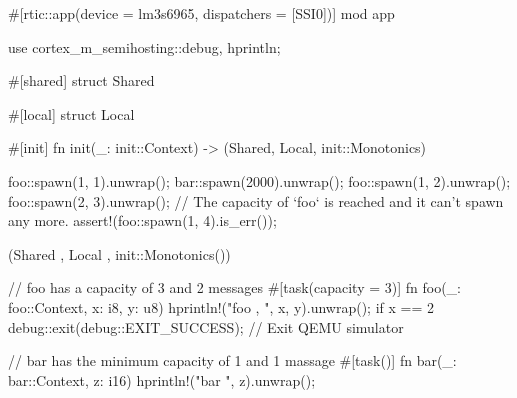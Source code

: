 #[rtic::app(device = lm3s6965, dispatchers = [SSI0])]
mod app {
    use cortex_m_semihosting::{debug, hprintln};

    #[shared]
    struct Shared {}

    #[local]
    struct Local {}

    #[init]
    fn init(_: init::Context) -> (Shared, Local, init::Monotonics) {
        foo::spawn(1, 1).unwrap();
        bar::spawn(2000).unwrap();
        foo::spawn(1, 2).unwrap();
        foo::spawn(2, 3).unwrap();
        // The capacity of `foo` is reached and it can't spawn any more.
        assert!(foo::spawn(1, 4).is_err()); 

        (Shared {}, Local {}, init::Monotonics())
    }

    // foo has a capacity of 3 and 2 messages
    #[task(capacity = 3)]
    fn foo(_: foo::Context, x: i8, y: u8) {
        hprintln!("foo {}, {}", x, y).unwrap();
        if x == 2 {
            debug::exit(debug::EXIT_SUCCESS); // Exit QEMU simulator
        }
    }

    // bar has the minimum capacity of 1 and 1 massage
    #[task()]
    fn bar(_: bar::Context, z: i16){
        hprintln!("bar {}", z).unwrap();
    }
}
